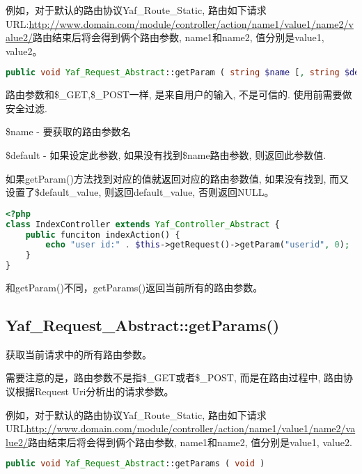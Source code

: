 例如，对于默认的路由协议Yaf\_Route\_Static, 路由如下请求URL:\url{http://www.domain.com/module/controller/action/name1/value1/name2/value2/}路由结束后将会得到俩个路由参数, name1和name2, 值分别是value1, value2。

\begin{lstlisting}[language=PHP]
public void Yaf_Request_Abstract::getParam ( string $name [, string $default ] )
\end{lstlisting}

路由参数和\$\_GET,\$\_POST一样, 是来自用户的输入, 不是可信的. 使用前需要做安全过滤.


\begin{compactitem}
\item \$name - 要获取的路由参数名
\item \$default - 如果设定此参数, 如果没有找到\$name路由参数, 则返回此参数值.
\end{compactitem}

如果getParam()方法找到对应的值就返回对应的路由参数值, 如果没有找到, 而又设置了\$default\_value, 则返回default\_value, 否则返回NULL。

\begin{lstlisting}[language=PHP]
<?php
class IndexController extends Yaf_Controller_Abstract {
    public funciton indexAction() {
        echo "user id:" . $this->getRequest()->getParam("userid", 0);
    }
}
\end{lstlisting}



和getParam()不同，getParams()返回当前所有的路由参数。




\subsection{Yaf\_Request\_Abstract::getParams()}

获取当前请求中的所有路由参数。

需要注意的是，路由参数不是指\$\_GET或者\$\_POST, 而是在路由过程中, 路由协议根据Request Uri分析出的请求参数。

例如，对于默认的路由协议Yaf\_Route\_Static, 路由如下请求URL\url{http://www.domain.com/module/controller/action/name1/value1/name2/value2/}路由结束后将会得到俩个路由参数, name1和name2, 值分别是value1, value2.


\begin{lstlisting}[language=PHP]
public void Yaf_Request_Abstract::getParams ( void )
\end{lstlisting}


